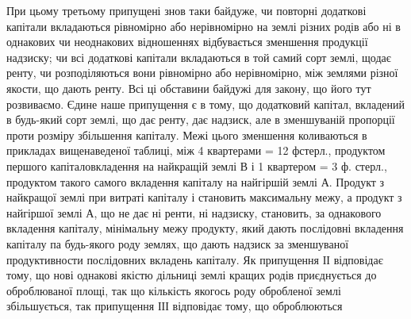 При цьому третьому припущені знов таки байдуже, чи повторні додаткові
капітали вкладаються рівномірно або нерівномірно на землі різних родів або ні
в однакових чи неоднакових відношеннях відбувається зменшення продукції
надзиску; чи всі додаткові капітали вкладаються в той самий сорт землі, щодає
ренту, чи розподіляються вони рівномірно або нерівномірно, між землями
різної якости, що дають ренту. Всі ці обставини байдужі для закону, що його тут
розвиваємо. Єдине наше припущення є в тому, що додатковий капітал,
вкладений в будь-який сорт землі, що дає ренту, дає надзиск, але в зменшуваній
пропорції проти розміру збільшення капіталу. Межі цього зменшення
коливаються в прикладах вищенаведеної таблиці, між 4 квартерами = 12 фстерл.,
продуктом першого капіталовкладення на найкращій землі В і 1 квартером
= 3 ф. стерл., продуктом такого самого вкладення капіталу на найгіршій
землі А. Продукт з найкращої землі при витраті капіталу і становить максимальну
межу, а продукт з найгіршої землі А, що не дає ні ренти, ні надзиску,
становить, за однакового вкладення капіталу, мінімальну межу продукту,
який дають послідовні вкладення капіталу па будь-якого роду землях, що дають надзиск за зменшуваної
продуктивности послідовних вкладень капіталу. Як
припущення ІІ відповідає тому, що нові однакові якістю дільниці землі кращих
родів приєднується до оброблюваної площі, так що кількість якогось роду обробленої
землі збільшується, так припущення ІІІ відповідає тому, що оброблюються
\parbreak{}  %
